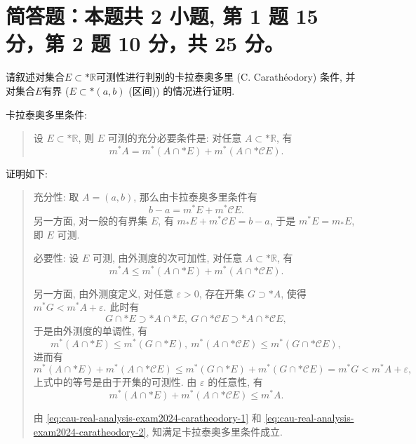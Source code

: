 \section{简答题：本题共 2 小题, 第 1 题 15 分，第 2 题 10 分，共 25 分。}



\begin{question}[points = 15]
  请叙述对集合$E \subset* \mathbb{R}$可测性进行判别的卡拉泰奥多里 (C. Carathéodory) 条件, 并对集合$E$有界 ($E \subset* (a, b)$ (区间)) 的情况进行证明.
\end{question}

\begin{solution}
  卡拉泰奥多里条件: 

  \begin{quote}
  设 \(E \subset* \mathbb{R}\), 则 \(E\) 可测的充分必要条件是: 对任意 \(A \subset* \mathbb{R}\), 有
  \[m^* A = m^*(A \cap* E) + m^*(A \cap* \mathscr{C} E).\]
  \end{quote}

  证明如下:

  \begin{quote}
  充分性: 
  取 \(A = (a, b)\), 那么由卡拉泰奥多里条件有
  \[b - a = m^* E + m^* \mathscr{C} E.\]
  另一方面, 对一般的有界集 \(E\), 有 \(m_* E + m^* \mathscr{C} E = b - a\), 于是 \(m^* E = m_* E\), 即 \(E\) 可测.

  必要性: 
  设 \(E\) 可测, 由外测度的次可加性, 对任意 \(A \subset* \mathbb{R}\), 有
  \begin{equation}
  \label{eq:cau-real-analysis-exam2024-caratheodory-1}
  m^* A \leqslant m^*(A \cap* E) + m^*(A \cap* \mathscr{C} E).
  \end{equation}

  另一方面, 由外测度定义, 对任意 \(\varepsilon > 0\), 存在开集 \(G \supset* A\), 使得 \(m^* G < m^* A + \varepsilon\). 此时有
  \[G \cap* E \supset* A \cap* E, ~ G \cap* \mathscr{C} E \supset* A \cap* \mathscr{C} E,\]
  于是由外测度的单调性, 有
  \[m^* (A \cap* E) \leqslant m^* (G \cap* E), ~ m^* (A \cap* \mathscr{C} E) \leqslant m^* (G \cap* \mathscr{C} E),\]
  进而有
  \[m^* (A \cap* E) + m^* (A \cap* \mathscr{C} E) \leqslant m^* (G \cap* E) + m^* (G \cap* \mathscr{C} E) = m^* G < m^* A + \varepsilon,\]
  上式中的等号是由于开集的可测性. 由 \(\varepsilon\) 的任意性, 有
  \begin{equation}
  \label{eq:cau-real-analysis-exam2024-caratheodory-2}
  m^* (A \cap* E) + m^* (A \cap* \mathscr{C} E) \leqslant m^* A.
  \end{equation}

  由 \eqref{eq:cau-real-analysis-exam2024-caratheodory-1} 和 \eqref{eq:cau-real-analysis-exam2024-caratheodory-2}, 知满足卡拉泰奥多里条件成立.
  \end{quote}
\end{solution}

